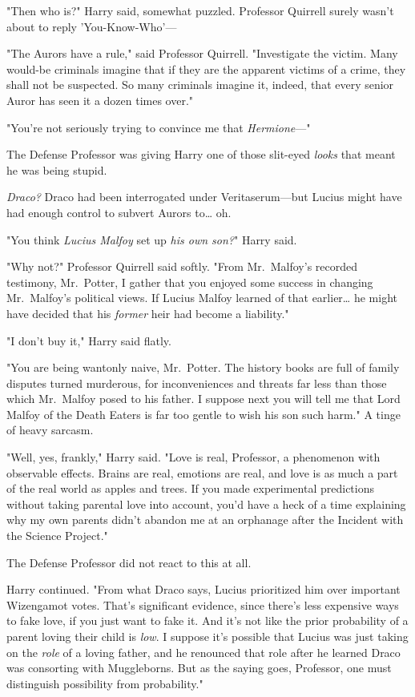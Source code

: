 "Then who is?" Harry said, somewhat puzzled. Professor Quirrell surely wasn't 
about to reply 'You-Know-Who'---

"The Aurors have a rule," said Professor Quirrell. "Investigate the victim. 
Many would-be criminals imagine that if they are the apparent victims of a 
crime, they shall not be suspected. So many criminals imagine it, indeed, that 
every senior Auror has seen it a dozen times over."

"You're not seriously trying to convince me that \emph{Hermione}---"

The Defense Professor was giving Harry one of those slit-eyed \emph{looks} that 
meant he was being stupid.

\emph{Draco?} Draco had been interrogated under Veritaserum---but Lucius might 
have had enough control to subvert Aurors to{\ldots} oh.

"You think \emph{Lucius Malfoy} set up \emph{his own son?}" Harry said.

"Why not?" Professor Quirrell said softly. "From Mr.~Malfoy's recorded 
testimony, Mr.~Potter, I gather that you enjoyed some success in changing 
Mr.~Malfoy's political views. If Lucius Malfoy learned of that earlier{\ldots} 
he might have decided that his \emph{former} heir had become a liability."

"I don't buy it," Harry said flatly.

"You are being wantonly naive, Mr.~Potter. The history books are full of family 
disputes turned murderous, for inconveniences and threats far less than those 
which Mr.~Malfoy posed to his father. I suppose next you will tell me that Lord 
Malfoy of the Death Eaters is far too gentle to wish his son such harm." A 
tinge of heavy sarcasm.

"Well, yes, frankly," Harry said. "Love is real, Professor, a phenomenon with 
observable effects. Brains are real, emotions are real, and love is as much a 
part of the real world as apples and trees. If you made experimental 
predictions without taking parental love into account, you'd have a heck of a 
time explaining why my own parents didn't abandon me at an orphanage after the 
Incident with the Science Project."

The Defense Professor did not react to this at all.

Harry continued. "From what Draco says, Lucius prioritized him over important 
Wizengamot votes. That's significant evidence, since there's less expensive 
ways to fake love, if you just want to fake it. And it's not like the prior 
probability of a parent loving their child is \emph{low}. I suppose it's 
possible that Lucius was just taking on the \emph{role} of a loving father, and 
he renounced that role after he learned Draco was consorting with Muggleborns. 
But as the saying goes, Professor, one must distinguish possibility from 
probability."

